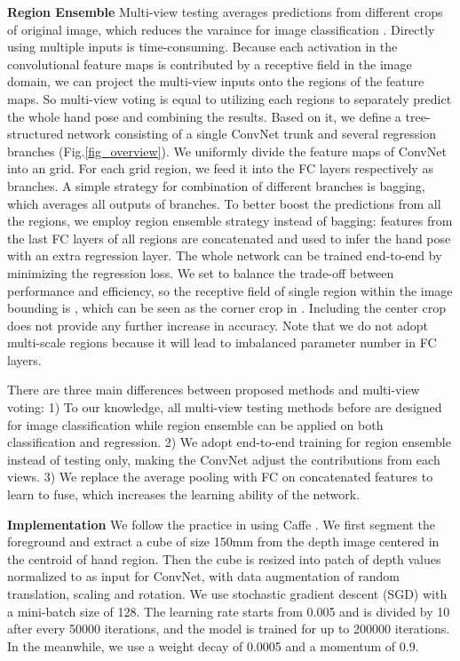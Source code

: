 \documentclass{article}
\begin{document}
\noindent\textbf{Region Ensemble}\hspace{2mm} Multi-view testing averages predictions from different crops of original image, which reduces the varaince for image classification \cite{krizhevsky2012imagenet}. Directly using multiple inputs is time-consuming. Because each activation in the convolutional feature maps is contributed by a receptive field in the image domain, we can project the multi-view inputs onto the regions of the feature maps. So multi-view voting is equal to utilizing each regions to separately predict the whole hand pose and combining the results. Based on it, we define a tree-structured network consisting of a single ConvNet trunk and several regression branches (Fig.\ref{fig_overview}). We uniformly divide the feature maps of ConvNet into an  grid. For each grid region, we feed it into the FC layers respectively as branches. A simple strategy for combination of different branches is bagging, which averages all outputs of branches. To better boost the predictions from all the regions, we employ region ensemble strategy instead of bagging: features from the last FC layers of all regions are concatenated and used to infer the hand pose with an extra regression layer. The whole network can be trained end-to-end by minimizing the regression loss. We set  to balance the trade-off between performance and efficiency, so the receptive field of single region within the  image bounding is , which can be seen as the corner crop in \cite{krizhevsky2012imagenet}. Including the center crop does not provide any further increase in accuracy. Note that we do not adopt multi-scale regions because it will lead to imbalanced parameter number in FC layers.

There are three main differences between proposed methods and multi-view voting: 1) To our knowledge, all multi-view testing methods before are designed for image classification while region ensemble can be applied on both classification and regression. 2) We adopt end-to-end training for region ensemble instead of testing only, making the ConvNet adjust the contributions from each views. 3) We replace the average pooling with FC on concatenated features to learn to fuse, which increases the learning ability of the network.

\noindent\textbf{Implementation}\hspace{2mm} We follow the practice in \cite{tompson2014real} \cite{oberweger2015hands} using Caffe \cite{jia2014caffe}. We first segment the foreground and extract a cube of size 150mm from the depth image centered in the centroid of hand region. Then the cube is resized into  patch of depth values normalized to  as input for ConvNet, with data augmentation of random translation, scaling and rotation. We use stochastic gradient descent (SGD) with a mini-batch size of 128. The learning rate starts from 0.005 and is divided by 10 after every 50000 iterations, and the model is trained for up to 200000 iterations. In the meanwhile, we use a weight decay of 0.0005 and a momentum of 0.9.
\end{document}
